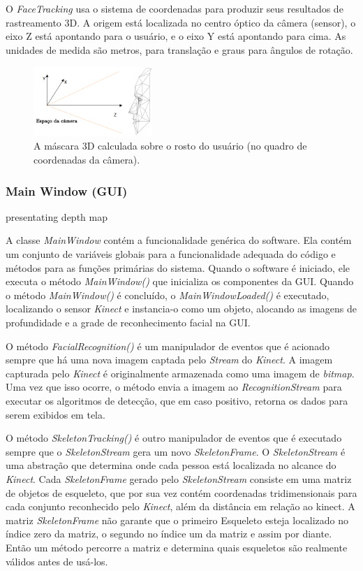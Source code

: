 O \textit{FaceTracking} usa o sistema de coordenadas para produzir seus resultados de rastreamento 3D. A origem está localizada no centro óptico da câmera (sensor), o eixo Z está apontando para o usuário, e o eixo Y está apontando para cima. As unidades de medida são metros, para translação e graus para ângulos de rotação.


\begin{figure}[ht]
\centering
\includegraphics[width=0.4\textwidth]{images/3dface.png}
\caption{A máscara 3D calculada sobre o rosto do usuário (no quadro de coordenadas da câmera).}
\label{fig:3dfaces}
\end{figure}



\subsubsection{Main Window (GUI)}\label{sec:mainWindow}
presentating depth map


A classe \textit{MainWindow} contém a funcionalidade genérica do software. Ela contém um conjunto de variáveis globais para a funcionalidade adequada do código e métodos para as funções primárias do sistema. Quando o software é iniciado, ele executa o método \textit{MainWindow()} que inicializa os componentes da GUI. Quando o método \textit{MainWindow()} é concluído, o \textit{MainWindowLoaded()} é executado, localizando o sensor \textit{Kinect} e instancia-o como um objeto, alocando as imagens de profundidade e a grade de reconhecimento facial na GUI.

O método \textit{FacialRecognition()} é um manipulador de eventos que é acionado sempre que há uma nova imagem captada pelo \textit{Stream} do \textit{Kinect}. A imagem capturada pelo \textit{Kinect} é originalmente armazenada como uma imagem de \textit{bitmap}. Uma vez que isso ocorre, o método envia a imagem ao \textit{RecognitionStream} para executar os algoritmos de detecção, que em caso positivo, retorna os dados para serem exibidos em tela.

O método \textit{SkeletonTracking()} é outro manipulador de eventos que é executado sempre que o \textit{SkeletonStream} gera um novo \textit{SkeletonFrame}. O \textit{SkeletonStream} é uma abstração que determina onde cada pessoa está localizada no alcance do \textit{Kinect}. Cada \textit{SkeletonFrame} gerado pelo \textit{SkeletonStream} consiste em uma matriz de objetos de esqueleto, que por sua vez contém coordenadas tridimensionais para cada conjunto reconhecido pelo \textit{Kinect}, além da distância em relação ao kinect. A matriz \textit{SkeletonFrame} não garante que o primeiro Esqueleto esteja localizado no índice zero da matriz, o segundo no índice um da matriz e assim por diante. Então um método percorre a matriz e determina quais esqueletos são realmente válidos antes de usá-los.

